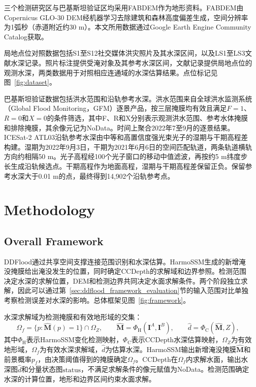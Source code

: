 \documentclass[authoryear,preprint,12pt]{elsarticle}
\begin{document}


三个检测研究区与巴基斯坦验证区均采用FABDEM作为地形资料。FABDEM由Copernicus GLO-30 DEM经机器学习去除建筑和森林高度偏差生成，空间分辨率为1弧秒（赤道附近约30 m）。本文所用数据通过Google Earth Engine Community Catalog获取\citep{hawker2022fabdem,fabdemGEE}。

局地点位对照数据包括S1至S12社交媒体洪灾照片及其水深区间，以及LS1至LS3文献水深记录\citep{zhang2024yolomaskrcnn}。照片标注提供受淹对象及其参考水深区间，文献记录提供局地点位的观测水深，两类数据用于对照相应连通域的水深估算结果。点位标记见图~\ref{fig:dataset}。

巴基斯坦验证数据包括洪水范围和沿轨参考水深。洪水范围来自全球洪水监测系统（Global Flood Monitoring，GFM）逐景产品，按三层掩膜均有效且满足\(F=1\)、\(R=0\)和\(X=0\)的条件筛选，其中F、R和X分别表示观测洪水范围、参考水体掩膜和排除掩膜，其余像元记为NoData\citep{gfm2025pum}。时间上聚合2022年7至9月的逐景结果\citep{betterle2024water}。ICESat-2 ATL03沿轨参考水深由中等和高置信度强光束光子的湿期与干期高程差构建。湿期为2022年9月3日，干期为2021年6月6日的空间匹配轨道，两条轨道横轨方向约相隔50 m。光子高程经100个光子窗口的移动中值滤波，再按约5 m纬度步长生成沿轨候选点。干期高程作为地面高程，湿期与干期高程差保留正负。保留参考水深大于0.01 m的点，最终得到14,902个沿轨参考点。

\begingroup
\section{Methodology}\label{sec:methodology}

\subsection{Overall Framework}\label{sec:overview}

DDFlood通过共享空间支撑连接范围识别和水深估算。HarmoSSM生成的新增淹没掩膜给出淹没发生的位置，同时确定CCDepth的求解域和边界参照。检测范围决定水深的求解位置，DEM和检测边界共同决定水面求解条件。两个阶段独立求解，因此可以通过第~\ref{sec:ddflood_framework_evaluation}节的输入范围对比单独考察检测误差对水深的影响。总体框架见图~\ref{fig:framework}。

水深求解域为检测掩膜和有效地形域的交集：
\begin{equation}\label{eq:framework_support}
 \Omega_f=\{p:\hat{\mathbf M}(p)=1\}\cap\Omega_Z,\qquad
 \hat{\mathbf M}=\Phi_{\mathrm H}(\mathbf I^A,\mathbf I^B),\qquad
 \hat d=\Phi_{\mathrm C}(\hat{\mathbf M},Z),
\end{equation}
其中\(\Phi_{\mathrm H}\)表示HarmoSSM变化检测映射，\(\Phi_{\mathrm C}\)表示CCDepth水深估算映射，\(\Omega_Z\)为有效地形域，\(\Omega_f\)为有效水深求解域，\(\hat d\)为估算水深。HarmoSSM输出新增淹没掩膜\(\hat{\mathbf M}\)和前景概率\(p_f\)，由决策阈值得到的掩膜确定\(\Omega_f\)。CCDepth在\(\Omega_f\)内求解水面，输出水深图\(\hat d\)和分量状态图\(\mathrm{status}\)，不满足求解条件的像元赋值为NoData。检测范围确定水深的计算位置，地形和边界区间约束水面求解。
\end{document}
